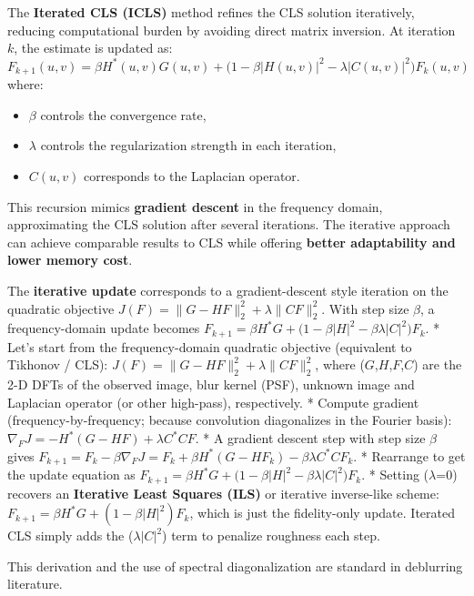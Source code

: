 \documentclass[11pt]{article}
\providecommand{\tightlist}{%
      \setlength{\itemsep}{0pt}\setlength{\parskip}{0pt}}
\begin{document}
The \textbf{Iterated CLS (ICLS)} method refines the CLS solution
iteratively, reducing computational burden by avoiding direct matrix
inversion. At iteration \(k\), the estimate is updated as:
\(F_{k+1}(u, v) = \beta H^*(u, v) G(u, v) + \big(1 - \beta |H(u, v)|^2 - \lambda |C(u, v)|^2 \big) F_k(u, v)\)
where:

\begin{itemize}
\tightlist
\item
  \(\beta\) controls the convergence rate,
\item
  \(\lambda\) controls the regularization strength in each iteration,
\item
  \(C(u, v)\) corresponds to the Laplacian operator.
\end{itemize}

This recursion mimics \textbf{gradient descent} in the frequency domain,
approximating the CLS solution after several iterations. The iterative
approach can achieve comparable results to CLS while offering
\textbf{better adaptability and lower memory cost}.

The \textbf{iterative update} corresponds to a gradient-descent style
iteration on the quadratic objective
\(J(F)=\|G-HF\|_2^2+\lambda\|C F\|_2^2\). With step size \(\beta\), a
frequency-domain update becomes
\(F_{k+1}=\beta H^*G + \big(1-\beta|H|^2-\beta\lambda|C|^2\big)F_k\). *
Let's start from the frequency-domain quadratic objective (equivalent to
Tikhonov / CLS):
\(J(F)=\lVert G - H F\rVert_2^2 + \lambda\lVert C F\rVert_2^2\), where
(\(G\),\(H\),\(F\),\(C\)) are the 2-D DFTs of the observed image, blur
kernel (PSF), unknown image and Laplacian operator (or other high-pass),
respectively. * Compute gradient (frequency-by-frequency; because
convolution diagonalizes in the Fourier
basis):\(\nabla_F J = -H^*(G - H F) + \lambda C^* C F\). * A gradient
descent step with step size \(\beta\) gives
\(F_{k+1} = F_k - \beta \nabla_F J = F_k + \beta H^*(G - H F_k) - \beta \lambda C^* C F_k\).
* Rearrange to get the update equation as
\(F_{k+1} = \beta H^* G + \big(1 - \beta |H|^2 - \beta \lambda |C|^2\big) F_k\).
* Setting (\(\lambda\)=0) recovers an \textbf{Iterative Least Squares
(ILS)} or iterative inverse-like scheme:
\(F_{k+1} = \beta H^*G + (1 - \beta |H|^2) F_k\), which is just the
fidelity-only update. Iterated CLS simply adds the (\(\lambda |C|^2\))
term to penalize roughness each step.

This derivation and the use of spectral diagonalization are standard in
deblurring literature.
\end{document}
